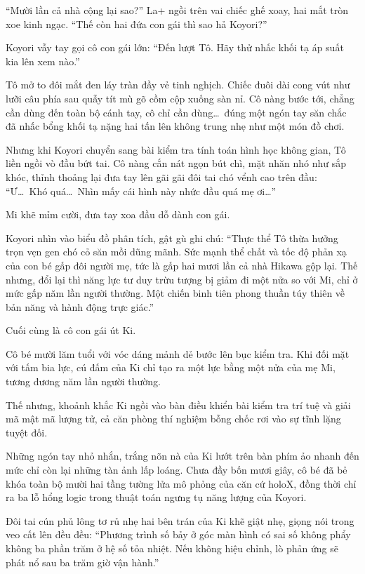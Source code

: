 \documentclass[../main.tex]{subfiles}
\begin{document}
``Mười lần cả nhà cộng lại sao?'' La+ ngồi trên vai chiếc ghế xoay, hai mắt tròn xoe kinh ngạc. ``Thế còn hai đứa con gái thì sao hả Koyori?''

Koyori vẫy tay gọi cô con gái lớn: ``Đến lượt Tô. Hãy thử nhấc khối tạ áp suất kia lên xem nào.''

Tô mở to đôi mắt đen láy tràn đầy vẻ tinh nghịch. Chiếc đuôi dài cong vút như lưỡi câu phía sau quẫy tít mù gõ cồm cộp xuống sàn nỉ. Cô nàng bước tới, chẳng cần dùng đến toàn bộ cánh tay, cô chỉ cần dùng\dots\ đúng một ngón tay săn chắc đã nhấc bổng khối tạ nặng hai tấn lên không trung nhẹ như một món đồ chơi.

Nhưng khi Koyori chuyển sang bài kiểm tra tính toán hình học không gian, Tô liền ngồi vò đầu bứt tai. Cô nàng cắn nát ngọn bút chì, mặt nhăn nhó như sắp khóc, thỉnh thoảng lại đưa tay lên gãi gãi đôi tai chó vểnh cao trên đầu: ``Ư\dots\ Khó quá\dots\ Nhìn mấy cái hình này nhức đầu quá mẹ ơi\dots''

Mi khẽ mỉm cười, đưa tay xoa đầu dỗ dành con gái.

Koyori nhìn vào biểu đồ phân tích, gật gù ghi chú: ``Thực thể Tô thừa hưởng trọn vẹn gen chó cỏ săn mồi dũng mãnh. Sức mạnh thể chất và tốc độ phản xạ của con bé gấp đôi người mẹ, tức là gấp hai mươi lần cả nhà Hikawa gộp lại. Thế nhưng, đổi lại thì năng lực tư duy trừu tượng bị giảm đi một nửa so với Mi, chỉ ở mức gấp năm lần người thường. Một chiến binh tiên phong thuần túy thiên về bản năng và hành động trực giác.''

Cuối cùng là cô con gái út Ki.

Cô bé mười lăm tuổi với vóc dáng mảnh dẻ bước lên bục kiểm tra. Khi đối mặt với tấm bia lực, cú đấm của Ki chỉ tạo ra một lực bằng một nửa của mẹ Mi, tương đương năm lần người thường.

Thế nhưng, khoảnh khắc Ki ngồi vào bàn điều khiển bài kiểm tra trí tuệ và giải mã mật mã lượng tử, cả căn phòng thí nghiệm bỗng chốc rơi vào sự tĩnh lặng tuyệt đối.

Những ngón tay nhỏ nhắn, trắng nõn nà của Ki lướt trên bàn phím ảo nhanh đến mức chỉ còn lại những tàn ảnh lấp loáng. Chưa đầy bốn mươi giây, cô bé đã bẻ khóa toàn bộ mười hai tầng tường lửa mô phỏng của căn cứ holoX, đồng thời chỉ ra ba lỗ hổng logic trong thuật toán ngưng tụ năng lượng của Koyori.

Đôi tai cún phủ lông tơ rủ nhẹ hai bên trán của Ki khẽ giật nhẹ, giọng nói trong veo cất lên đều đều: ``Phương trình số bảy ở góc màn hình có sai số không phẩy không ba phần trăm ở hệ số tỏa nhiệt. Nếu không hiệu chỉnh, lò phản ứng sẽ phát nổ sau ba trăm giờ vận hành.''
\end{document}
